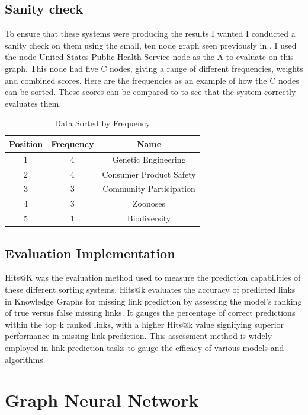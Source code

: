 \documentclass{l4proj}
\begin{document}
\subsection{Sanity check}

To ensure that these systems were producing the results I wanted I conducted a sanity check on them using the small, ten node graph seen previously in . I used the node United States Public Health Service node as the A to evaluate on this graph. This node had five C nodes, giving a range of different frequencies, weights and combined scores. Here are the frequencies as an example of how the C nodes can be sorted. These scores can be compared to  to see that the system correctly evaluates them.\\

\begin{table}[h]
\centering
\caption{Data Sorted by Frequency}
\begin{tabular}{|c|c|c|}
\hline
\textbf{Position} & \textbf{Frequency} & \textbf{Name} \\ \hline
1 & 4 & Genetic Engineering \\ \hline
2 & 4 & Consumer Product Safety \\ \hline
3 & 3 & Community Participation \\ \hline
4 & 3 & Zoonoses \\ \hline
5 & 1 & Biodiversity \\ \hline
\end{tabular}
\end{table}

\subsection{Evaluation Implementation}

Hits@K was the evaluation method used to measure the prediction capabilities of these different sorting systems. Hits@k evaluates the accuracy of predicted links in Knowledge Graphs for missing link prediction by assessing the model's ranking of true versus false missing links. It gauges the percentage of correct predictions within the top k ranked links, with a higher Hits@k value signifying superior performance in missing link prediction. This assessment method is widely employed in link prediction tasks to gauge the efficacy of various models and algorithms. 

\section{Graph Neural Network}
\end{document}

